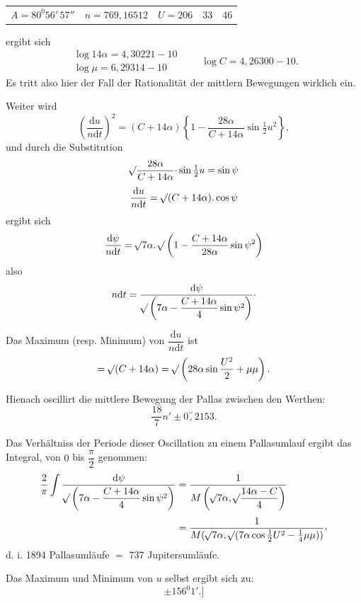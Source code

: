 \begin{landscape}
\begin{center}
\begin{tabular}{@{}lll@{}}
\(A=80^0 56'\,57''\)&\(n=769{,}16512\)&\(U=206\quad33\quad46\)
\end{tabular}
\end{center}
ergibt sich
\[
\begin{gathered}
\log14\alpha=4{,}30221-10\\
\log\mu=6{,}29314-10
\end{gathered}
\qquad\log C=4{,}26300-10.
\]
Es tritt also hier der Fall der Rationalität der mittlern Bewegungen wirklich ein.
\par\noindent\hspace*{\parindent}Weiter wird
\[
\left(\frac{\mathrm{d}u}{n\mathrm{d}t}\right)^2=(C+14\alpha)\left\{1-\frac{28\alpha}{C+14\alpha}\sin\tfrac12u^2\right\},
\]
und durch die Substitution
\[
\mathord{{}^{}\!\surd}\frac{28\alpha}{C+14\alpha}\mathpunct{\cdot}\sin\tfrac12u=\sin\psi
\]
\[
\frac{\mathrm{d}u}{n\mathrm{d}t}=\mathord{{}^{}\!\surd}(C+14\alpha)\mathpunct{.}\cos\psi
\]
ergibt sich
\[
\frac{\mathrm{d}\psi}{n\mathrm{d}t}=\mathord{{}^{}\!\surd}7\alpha\mathpunct{.}\mathord{{}^{}\!\surd}\left(1-\frac{C+14\alpha}{28\alpha}\sin\psi^2\right)
\]
also
\[
n\mathrm{d}t=\frac{\mathrm{d}\psi}{\mathord{{}^{}\!\surd}\left(7\alpha-\dfrac{C+14\alpha}{4}\sin\psi^2\right)}\mathpunct{\cdot}
\]
\par\noindent\hspace*{\parindent}Das Maximum (resp. Minimum) von \(\dfrac{\mathrm{d}u}{n\mathrm{d}t}\) ist
\[
=\mathord{{}^{}\!\surd}(C+14\alpha)=\mathord{{}^{}\!\surd}\left(28\alpha\sin\frac{U^2}{2}+\mu\mu\right).
\]
\par\noindent\hspace*{\parindent}Hienach oscillirt die mittlere Bewegung der Pallas zwischen den Werthen:
\[
\frac{18}{7}n'\pm0\overset{\prime\prime}{,}2153.
\]
\par\noindent\hspace*{\parindent}Das Verhältniss der Periode dieser Oscillation zu einem Pallasumlauf ergibt das Integral, von \(0\) bis \(\dfrac{\pi}{2}\) genommen:
\[
\begin{aligned}
\frac{2}{\pi}\int\frac{\mathrm{d}\psi}{\BareRoot{\left(7\alpha-\dfrac{C+14\alpha}{4}\sin\psi^2\right)}}
&=\frac{1}{M\left(\BareRoot{7\alpha},\BareRoot{\dfrac{14\alpha-C}{4}}\right)}\\[.8ex]
&=\frac{1}{M(\BareRoot{7\alpha},\BareRoot{(7\alpha\cos\tfrac12U^2-\tfrac14\mu\mu)})}\mathpunct{\raisebox{.35ex}{,}}
\end{aligned}
\]
d. i. 1894 Pallasumläufe \(=\) 737 Jupitersumläufe.
\par\noindent\hspace*{\parindent}Das Maximum und Minimum von \(u\) selbst ergibt sich zu:
\[
\pm156^0 1'.\text{]}
\]
\clearpage
\endgroup
\end{landscape}
